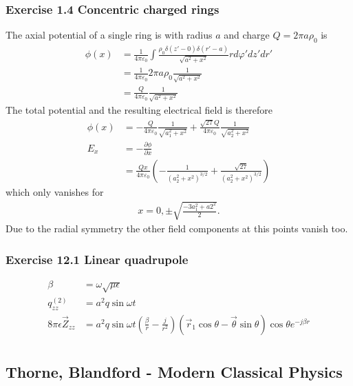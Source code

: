 \documentclass[10pt,a4paper]{article}
\theoremstyle{definition}
\begin{document}
\subsubsection{Exercise 1.4 Concentric charged rings}
The axial potential of a single ring is with radius $a$ and charge $Q=2\pi a\rho_0$ is
\begin{align}
    \phi(x)&=\frac{1}{4\pi\varepsilon_0}\int\frac{\rho_0\delta(z'-0)\delta(r'-a)}{\sqrt{a^2+x^2}}r d\varphi' dz' dr'\\
    &=\frac{1}{4\pi\varepsilon_0}2\pi a \rho_0\frac{1}{\sqrt{a^2+x^2}}\\
    &=\frac{Q}{4\pi\varepsilon_0}\frac{1}{\sqrt{a^2+x^2}}
\end{align}
The total potential and the resulting electrical field is therefore
\begin{align}
    \phi(x)&=-\frac{Q}{4\pi\varepsilon_0}\frac{1}{\sqrt{a_1^2+x^2}}+\frac{\sqrt{27}Q}{4\pi\varepsilon_0}\frac{1}{\sqrt{a_2^2+x^2}}\\
    E_x&=-\frac{\partial\phi}{\partial x}\\
    &=\frac{Qx}{4\pi\varepsilon_0}\left(-\frac{1}{(a_2^2+x^2)^{3/2}}+\frac{\sqrt{27}}{(a_2^2+x^2)^{3/2}}\right)
\end{align}
which only vanishes for
\begin{align}
    x=0,\pm\sqrt{\frac{-3a_1^2+a2^2}{2}}.
\end{align}
Due to the radial symmetry the other field components at this points vanish too.

\subsubsection{Exercise 12.1 Linear quadrupole}
\begin{align}
    \beta&=\omega\sqrt{\mu\epsilon}\\
    q_{zz}^{(2)}&=a^2q\sin\omega t\\
    8\pi\epsilon\vec{Z}_{zz}&=a^2q\sin\omega t\left(\frac{\beta}{r}-\frac{j}{r^2}\right)(\vec{r}_1\cos\theta-\vec{\theta}\sin\theta)\cos\theta e^{-j\beta r}\\
\end{align}

\subsection{{\sc Thorne, Blandford} - Modern Classical Physics}
\end{document}
